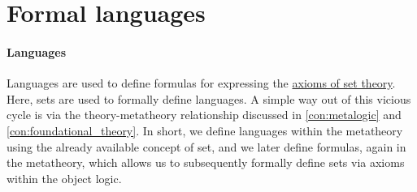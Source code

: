 \section{Formal languages}\label{sec:formal_languages}

\paragraph{Languages}

Languages are used to define formulas for expressing the \hyperref[def:zfc]{axioms of set theory}. Here, sets are used to formally define languages. A simple way out of this vicious cycle is via the theory-metatheory relationship discussed in \cref{con:metalogic} and \cref{con:foundational_theory}. In short, we define languages within the metatheory using the already available concept of set, and we later define formulas, again in the metatheory, which allows us to subsequently formally define sets via axioms within the object logic.

